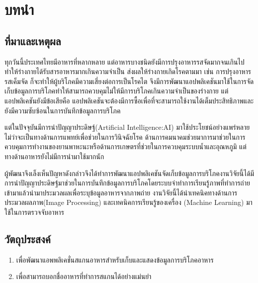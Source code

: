\chapter{บทนำ}

\section{ที่มาและเหตุผล }
ทุกวันนี้ประเทศไทยมีอาหารที่หลากหลาย แต่อาหารบางชนิดยังมีการปรุงอาหารรสจัดมากจนเกินไป ทำให้ร่างกายได้รับสารอาหารมากเกินความจำเป็น ส่งผลให้ร่างกายเกิดโรคตามมา เช่น การปรุงอาหารรสเค็มจัด ก็จะทำให้ผู้บริโภคมีความเสี่ยงต่อการเป็นโรคไต จึงมีการพัฒนาแอปพลิเคชันมาใช้ในการจัดเก็บข้อมูลการบริโภคทำให้สามารถควบคุมไม่ให้มีการบริโภคเกินความจำเป็นของร่างกาย แต่แอปพลิเคชันยังมีข้อเสียคือ แอปพลิเคชันจะต้องมีการซื้อเพื่อที่จะสามารถใช้งานได้เต็มประสิทธิภาพและยังมีความซับซ้อนในการบันทึกข้อมูลการบริโภค

แต่ในปัจจุบันมีการนำปัญญาประดิษฐ์(Artificial Intelligence:AI) มาใช้ประโยชน์อย่างแพร่หลาย ไม่ว่าจะเป็นทางด้านการแพทย์เพื่อช่วยในการวินิจฉัยโรค ด้านการคมนาคมช่วยมาการมาช่วยในการควบคุมการทำงานของยานพาหะนะหรือด้านการเกษตรที่ช่วยในการควบคุมระบบน้ำและอุณหภูมิ แต่ทางด้านอาหารยังไม่มีการนำมาใช้มากนัก 

ผู้พัฒนาจึงเล็งเห็นปัญหาดังกล่าวจึงได้ทำการพัฒนาแอปพลิเคชันจัดเก็บข้อมูลการบริโภคงานวิจัยนี้ได้มีการนำปัญญาประดิษฐ์มาช่วยในการบันทึกข้อมูลการบริโภคโดยระบบจำทำการเรียนรู้ภาพที่ทำการถ่ายเข้ามาแล้วนำมาประมวลผลเพื่อระบุข้อมูลอาหารจากภาพถ่าย งานวิจัยนี้ได้นำเทคนิคทางด้านการประมวลผลภาพ(Image Processing) และเทคนิคการเรียนรู้ของเครื่อง (Machine Learning) มาใช้ในการตรวจจับอาหาร



\section{วัตถุประสงค์}
\begin{enumerate}
	\item เพื่อพัฒนาแอพพลิเคชั่นสแกนอาหารสำหรับเก็บและแสดงข้อมูลการบริโภคอาหาร 
	\item  เพื่อสามารถบอกชื่ออาหารที่ทำการสแกนได้อย่างแม่นยำ  
\end{enumerate}

